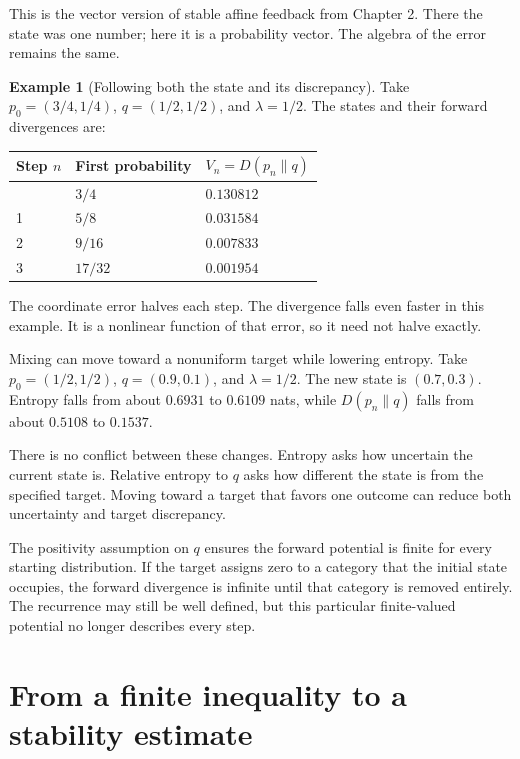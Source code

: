 \documentclass[11pt,oneside,openany]{book}
\theoremstyle{definition}
\newtheorem{example}{Example}[chapter]
\theoremstyle{remark}
\numberwithin{equation}{chapter}
\begin{document}
This is the vector version of stable affine feedback from Chapter 2. There the state was one number; here it is a probability vector. The algebra of the error remains the same.

\begin{example}[Following both the state and its discrepancy]

Take \(p_0=(3/4,1/4)\), \(q=(1/2,1/2)\), and \(\lambda=1/2\). The states and their forward divergences are:

\begin{longtable}[]{@{}lll@{}}
\toprule\noalign{}
Step \(n\) & First probability & \(V_n=D(p_n\|q)\) \\
\midrule\noalign{}
\endhead
\bottomrule\noalign{}
\endlastfoot
0 & \(3/4\) & \(0.130812\) \\
1 & \(5/8\) & \(0.031584\) \\
2 & \(9/16\) & \(0.007833\) \\
3 & \(17/32\) & \(0.001954\) \\
\end{longtable}

The coordinate error halves each step. The divergence falls even faster in this example. It is a nonlinear function of that error, so it need not halve exactly.

\end{example}

Mixing can move toward a nonuniform target while lowering entropy. Take \(p_0=(1/2,1/2)\), \(q=(0.9,0.1)\), and \(\lambda=1/2\). The new state is \((0.7,0.3)\). Entropy falls from about \(0.6931\) to \(0.6109\) nats, while \(D(p_n\|q)\) falls from about \(0.5108\) to \(0.1537\).

There is no conflict between these changes. Entropy asks how uncertain the current state is. Relative entropy to \(q\) asks how different the state is from the specified target. Moving toward a target that favors one outcome can reduce both uncertainty and target discrepancy.

The positivity assumption on \(q\) ensures the forward potential is finite for every starting distribution. If the target assigns zero to a category that the initial state occupies, the forward divergence is infinite until that category is removed entirely. The recurrence may still be well defined, but this particular finite-valued potential no longer describes every step.

\section{From a finite inequality to a stability estimate}\label{ch06-from-a-finite-inequality-to-a-stability-estimate}
\end{document}
